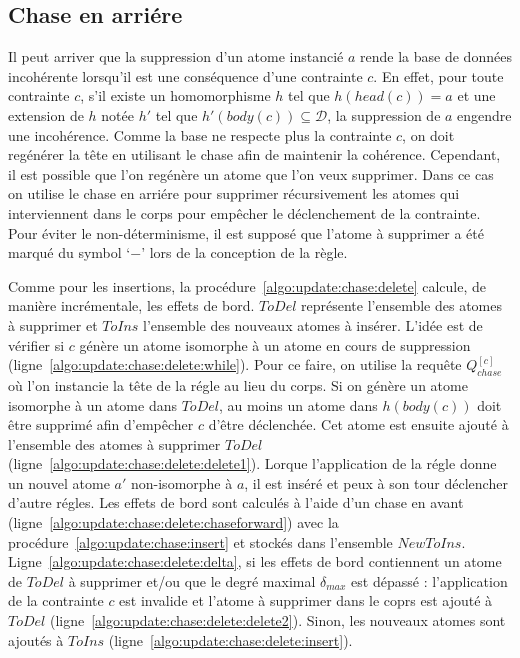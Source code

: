 \subsection{Chase en arriére}
Il peut arriver que la suppression d'un atome instancié $a$ rende la base de données incohérente lorsqu'il est une conséquence d'une contrainte $c$.
En effet, pour toute contrainte $c$, s'il existe un homomorphisme $h$ tel que $h(head(c)) = a$ et une extension de $h$ notée $h'$ tel que $h'(body(c)) \subseteq \mathcal{D}$, la suppression de $a$ engendre une incohérence.
Comme la base ne respecte plus la contrainte $c$, on doit regénérer la tête en utilisant le \gls{chase} afin de maintenir la cohérence.
Cependant, il est possible que l'on regénère un atome que l'on veux supprimer.
Dans ce cas on utilise le \gls{chase} en arriére pour supprimer récursivement les atomes qui interviennent dans le corps pour empêcher le déclenchement de la contrainte.
Pour éviter le non-déterminisme, il est supposé que l'atome à supprimer a été marqué du symbol `$-$' lors de la conception de la règle.

Comme pour les insertions, la procédure~\ref{algo:update:chase:delete} calcule, de manière incrémentale, les effets de bord.
$ToDel$ représente l'ensemble des atomes à supprimer et $ToIns$ l'ensemble des nouveaux atomes à insérer.
L'idée est de vérifier si $c$ génère un atome isomorphe à un atome en cours de suppression (ligne~\ref{algo:update:chase:delete:while}).
Pour ce faire, on utilise la requête $Q_{chase}^{[c]}$ où l'on instancie la tête de la régle au lieu du corps.
Si on génère un atome isomorphe à un atome dans $ToDel$, au moins un atome dans $h(body(c))$ doit être supprimé afin d'empêcher $c$ d'être déclenchée.
Cet atome est ensuite ajouté à l'ensemble des atomes à supprimer $ToDel$ (ligne~\ref{algo:update:chase:delete:delete1}).
Lorque l'application de la régle donne un nouvel atome $a'$ non-isomorphe à $a$, il est inséré et peux à son tour déclencher d'autre régles.
Les effets de bord sont calculés à l'aide d'un \gls{chase} en avant (ligne~\ref{algo:update:chase:delete:chaseforward}) avec la procédure~\ref{algo:update:chase:insert} et stockés dans l'ensemble $NewToIns$.
Ligne~\ref{algo:update:chase:delete:delta}, si les effets de bord contiennent un atome de $ToDel$ à supprimer et/ou que le degré maximal $\delta_{max}$ est dépassé : l'application de la contrainte $c$ est invalide et l'atome à supprimer dans le coprs est ajouté à $ToDel$ (ligne~\ref{algo:update:chase:delete:delete2}).
Sinon, les nouveaux atomes sont ajoutés à $ToIns$ (ligne~\ref{algo:update:chase:delete:insert}).

